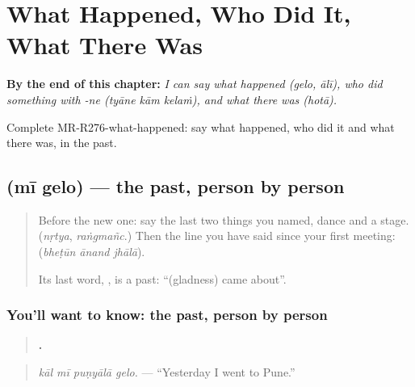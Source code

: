 
\chapter{What Happened, Who Did It, What There Was}
\label{ch:mr-what-happened-who-did-it-what-there-was}

\begin{chapteropening}
\textbf{By the end of this chapter:} \emph{I can say what happened (gelo, ālī), who did something with -ne (tyāne kām kelaṁ), and what there was (hotā).}

Complete MR-R276-what-happened: say what happened, who did it and what there was, in the past.
\end{chapteropening}

\section[\texorpdfstring{\mr{मी} \mr{गेलो} (mī gelo)}{मी गेलो (mī gelo)}]{  (mī gelo) — the past, person by person}

\label{lesson:MR-C276-gelo}



\begin{quote}
Before the new one: say the last two things you named, dance and a stage. (\emph{nṛtya}, \emph{raṅgmañc}.) Then the line you have said since your first meeting: \textbf{  } (\emph{bheṭūn ānand jhālā}).

Its last word, \textbf{}, is a past: \textquotedblleft{}(gladness) came about\textquotedblright{}.
\end{quote}

\subsection*{You'll want to know: the past, person by person}
\begin{quote}
\textbf{   .}
\end{quote}

\begin{quote}
\emph{kāl mī puṇyālā gelo.} — \textquotedblleft{}Yesterday I went to Pune.\textquotedblright{}
\end{quote}

